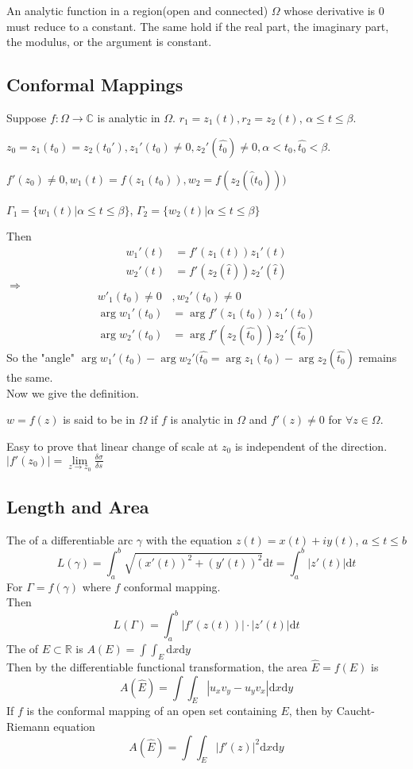 \begin{theorem}
    An analytic function in a region(\ie open and connected) $ \Omega $ whose derivative is 0 must reduce to a constant. The same hold if the real part, the imaginary part, the modulus, or the argument is constant.
\end{theorem}
\subsection{Conformal Mappings}
Suppose  $ f:\Omega\rightarrow \mathbb{C}$ is analytic in  $ \Omega $.  $ r_1=z_1(t),r_2=z_2(t) $, $ \alpha \leq t \leq \beta $.

 $ z_0=z_1(t_0)=z_2(t_0') ,z_1'(t_0)\not=0,z_2'(\hat{t_0})\not=0,\alpha<t_0,\hat{t_0}<\beta$.
 
  $ f'(z_0)\not=0, w_1(t)=f(z_1(t_0)),w_2=f(z_2(\hat(t_0))) $
  
   $ \Gamma_1=\{w_1(t)|\alpha \leq t \leq \beta\} $,  $ \Gamma_2=\{w_2(t)|\alpha \leq t \leq \beta\}$        
   
Then 
\begin{align*}
    w_1'(t)&=f'(z_1(t))z_1'(t)\\
    w_2'(t)&=f'(z_2(\hat{t}))z_2'(\hat{t})
\end{align*}
 $ \Rightarrow  $
 \begin{align*}
    w'_1(t_0)\not=0&,w_2'(t_0)\not=0\\
    \arg w_1'(t_0)&=\arg f'(z_1(t_0))z_1'(t_0)\\
    \arg w_2'(t_0)&=\arg f'(z_2(\hat{t_0}))z_2'(\hat{t_0})
 \end{align*} 
So the "angle"  $ \arg w_1'(t_0)-\arg w_2'(\hat{t_0}=\arg z_1(t_0)-\arg z_2(\hat{t_0}) $ remains the same. \\
Now we give the definition.
\begin{definition}
     $ w=f(z) $ is said to be  in  $ \Omega $ if  $ f  $ is analytic in  $ \Omega  $ and  $ f'(z)\not=0 $ for  $ \forall z\in \Omega$.    
\end{definition}
Easy to prove that linear change of scale at  $ z_0 $  is independent of the direction.\\
\ie  $ |f'(z_0)|=\lim\limits_{z\to z_0}\frac{\delta \sigma}{\delta s} $ 
\subsection{Length and Area}
The  of a differentiable arc  $ \gamma $ with the equation  $ z(t)=x(t)+iy(t) $, $ a \leq t \leq b $
\[L(\gamma)=\int_{a }^{b }\sqrt{(x'(t))^2+(y'(t))^2}\mathrm{d}t=\int_{a }^{b }|z'(t)|\mathrm{d}t\]   
For  $ \Gamma=f(\gamma) $ where  $ f  $ conformal mapping.\\
Then 
\[L(\Gamma)=\int_{a}^{b}|f'(z(t))|\cdot|z'(t)|\mathrm{d}t\]
The  of  $ E\subset \mathbb{R} $ is  $ A(E)=\int \int_{E}\mathrm{d}x\mathrm{d}y $\\
Then by the differentiable functional transformation, the area $ \hat{E}=f(E) $ is 
\[A(\hat{E})=\int \int_E|u_xv_y-u_yv_x|\mathrm{d}x\mathrm{d}y\]  
If  $ f  $ is the conformal mapping of an open set containing  $ E  $, then by Caucht-Riemann equation
\[A(\hat{E})=\int\int_E|f'(z)|^2\mathrm{d}x\mathrm{d}y\]
